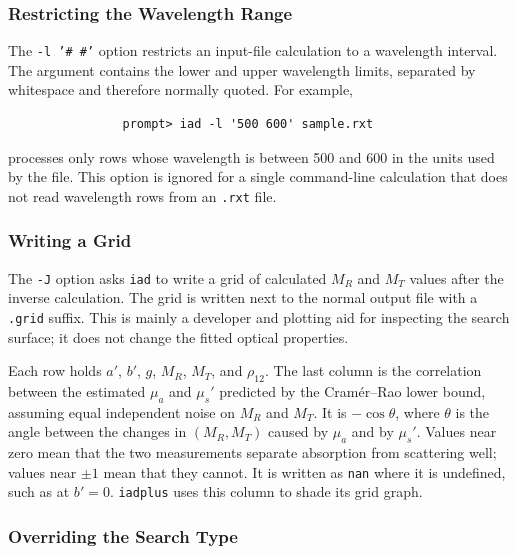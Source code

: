 \documentclass{article}
\newcommand\iadprog{\texttt{iad}}
\begin{document}
\subsubsection{Restricting the Wavelength Range}

The \texttt{-l '\# \#'} option restricts an input-file calculation to a
wavelength interval.  The argument contains the lower and upper wavelength
limits, separated by whitespace and therefore normally quoted.  For example,
\begin{verbatim}
                prompt> iad -l '500 600' sample.rxt
\end{verbatim}
processes only rows whose wavelength is between 500 and 600 in the units used
by the file.  This option is ignored for a single command-line calculation
that does not read wavelength rows from an \texttt{.rxt} file.

\subsubsection{Writing a Grid}

The \texttt{-J} option asks \iadprog{} to write a grid of calculated
$M_R$ and $M_T$ values after the inverse calculation.  The grid is written next
to the normal output file with a \texttt{.grid} suffix.  This is mainly a
developer and plotting aid for inspecting the search surface; it does not
change the fitted optical properties.

Each row holds $a'$, $b'$, $g$, $M_R$, $M_T$, and $\rho_{12}$.  The last
column is the correlation between the estimated $\mu_a$ and $\mu_s'$ predicted
by the Cram\'er--Rao lower bound, assuming equal independent noise on $M_R$ and
$M_T$.  It is $-\cos\theta$, where $\theta$ is the angle between the changes in
$(M_R, M_T)$ caused by $\mu_a$ and by $\mu_s'$.  Values near zero mean that the
two measurements separate absorption from scattering well; values near $\pm1$
mean that they cannot.  It is written as \texttt{nan} where it is undefined,
such as at $b'=0$.  \texttt{iadplus} uses this column to shade its grid graph.

\subsubsection{Overriding the Search Type}
\end{document}
